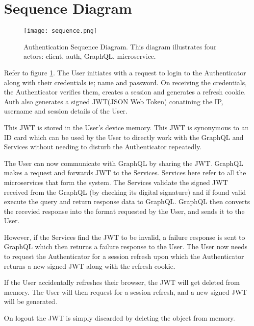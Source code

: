 \section{Sequence Diagram}

\begin{figure}[h!]
    \begin{center}
        \texttt{[image: sequence.png]}
    \end{center}
    \caption{Authentication Sequence Diagram. This diagram illustrates 
    four actors: client, auth, GraphQL, microservice.}
    \label{fig:sequence}
\end{figure}

Refer to figure \ref{fig:sequence}.
The User initiates with a request to login to the Authenticator along with their credentials ie; name and password.
On receiving the credentials, the Authenticator verifies them, creates a session and generates a refresh cookie.
Auth also generates a signed JWT(JSON Web Token) conatining the IP, username and session details of the User.

This JWT is stored in the User's device memory. This JWT is synonymous to an ID card which can be used by 
the User to directly work with the GraphQL and Services without needing to disturb the Authenticator repeatedly.

The User can now communicate with GraphQL by sharing the JWT.
GraphQL makes a request and forwards JWT to the Services. Services here refer to all the microservices that form the system.
The Services validate the signed JWT received from the GraphQL (by checking its digital signature) 
and if found valid execute the query and return response data to GraphQL.
GraphQL then converts the recevied response into the format requested by the User, and sends it to the User.

However, if the Services find the JWT to be invalid, a failure response is sent to
GraphQL which then returns a failure response to the User.
The User now needs to request the Authenticator for a session refresh upon which the Authenticator
returns a new signed JWT along with the refresh cookie.

If the User accidentally refreshes their browser, the JWT will get deleted from memory. 
The User will then request for a session refresh, and a new signed JWT will be generated.

On logout the JWT is simply discarded by deleting the object from memory.

